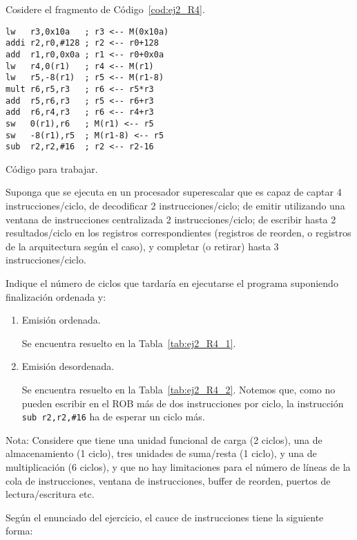 \begin{ejercicio}  \label{ej:2_R4}
    Cosidere el fragmento de Código~\ref{cod:ej2_R4}.
    \begin{listing}[H]
    \begin{verbatim}
lw   r3,0x10a   ; r3 <-- M(0x10a)
addi r2,r0,#128 ; r2 <-- r0+128
add  r1,r0,0x0a ; r1 <-- r0+0x0a
lw   r4,0(r1)   ; r4 <-- M(r1)
lw   r5,-8(r1)  ; r5 <-- M(r1-8)
mult r6,r5,r3   ; r6 <-- r5*r3
add  r5,r6,r3   ; r5 <-- r6+r3
add  r6,r4,r3   ; r6 <-- r4+r3
sw   0(r1),r6   ; M(r1) <-- r5
sw   -8(r1),r5  ; M(r1-8) <-- r5
sub  r2,r2,#16  ; r2 <-- r2-16
    \end{verbatim}
    \caption{Código para trabajar.}
    \label{cod:ej2_R4}
    \end{listing}
Suponga que se ejecuta en un procesador superescalar que es capaz de captar 4 instrucciones/ciclo, de decodificar 2 instrucciones/ciclo; de emitir utilizando una ventana de instrucciones centralizada 2 instrucciones/ciclo; de escribir hasta 2 resultados/ciclo en los registros correspondientes (registros de reorden, o registros de la arquitectura según el caso), y completar (o retirar) hasta 3 instrucciones/ciclo.

Indique el número de ciclos que tardaría en ejecutarse el programa suponiendo finalización ordenada y:
\begin{enumerate}
    \item Emisión ordenada.
    
    Se encuentra resuelto en la Tabla~\ref{tab:ej2_R4_1}.
    \item Emisión desordenada.
    
    Se encuentra resuelto en la Tabla~\ref{tab:ej2_R4_2}. Notemos que, como
    no pueden escribir en el ROB más de dos instrucciones por ciclo,
    la instrucción \verb|sub r2,r2,#16| ha de esperar un ciclo más.
\end{enumerate}
Nota: Considere que tiene una unidad funcional de carga (2 ciclos), una de almacenamiento (1 ciclo), tres unidades de suma/resta (1 ciclo), y una de multiplicación (6 ciclos), y que no hay limitaciones para el número de líneas de la cola de instrucciones, ventana de instrucciones, buffer de reorden, puertos de lectura/escritura etc.


Según el enunciado del ejercicio, el cauce de instrucciones tiene la siguiente forma:
\begin{figure}[H]
\centering
{}
\end{figure}
\end{ejercicio}
